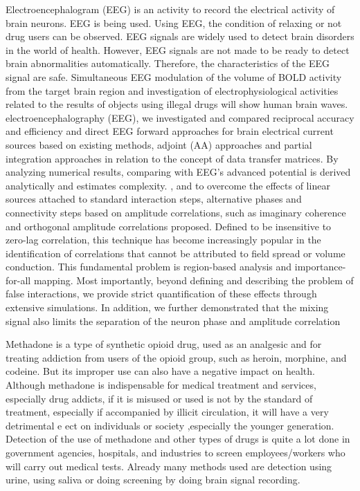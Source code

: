  Electroencephalogram (EEG) is an activity to record the electrical activity of brain neurons. EEG is being used.\cite{hanley2017brain} Using EEG, the condition of relaxing or not drug users can be observed. EEG signals are widely used to detect brain disorders in the world of health. However, EEG signals are not made to be ready to detect brain abnormalities automatically. Therefore, the characteristics of the EEG signal are safe.\cite{zotev2018real} Simultaneous EEG modulation of the volume of BOLD activity from the target brain region and investigation of electrophysiological activities related to the results of objects using illegal drugs will show human brain waves.\cite{chiang2017dangers} electroencephalography (EEG), we investigated and compared reciprocal accuracy and efficiency and direct EEG forward approaches for brain electrical current sources based on existing methods, adjoint (AA) approaches and partial integration approaches in relation to the concept of data transfer matrices. By analyzing numerical results, comparing with EEG's advanced potential is derived analytically and estimates complexity. \cite{palva2018ghost}, and to overcome the effects of linear sources attached to standard interaction steps, alternative phases and connectivity steps based on amplitude correlations, such as imaginary coherence and orthogonal amplitude correlations proposed. Defined to be insensitive to zero-lag correlation, this technique has become increasingly popular in the identification of correlations that cannot be attributed to field spread or volume conduction. This fundamental problem is region-based analysis and importance-for-all mapping. Most importantly, beyond defining and describing the problem of false interactions, we provide strict quantification of these effects through extensive simulations. In addition, we further demonstrated that the mixing signal also limits the separation of the neuron phase and amplitude correlation
 \par
 Methadone is a type of synthetic opioid drug, used as an analgesic and for treating addiction from users of the opioid group, such as heroin, morphine, and codeine. But its improper use can also have a negative impact on health. Although methadone is indispensable for medical treatment and services, especially drug addicts, if it is misused or used is not by the standard of treatment, especially if accompanied by illicit circulation, it will have a very detrimental e ect on individuals or society ,especially the younger generation. \cite{lim2015analysis} Detection of the use of methadone and other types of drugs is quite a lot done in government agencies, hospitals, and industries to screen employees/workers who will carry out medical tests. Already many methods used are detection using urine, using saliva or doing screening by doing brain signal recording. \cite{jin2015p300}
